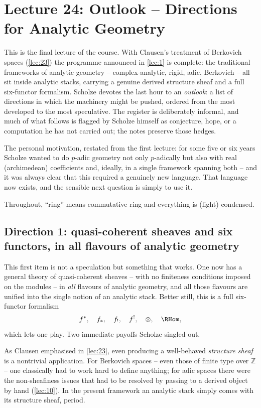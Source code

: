 \section{Lecture 24: Outlook -- Directions for Analytic Geometry}
\label{lec:24}

This is the final lecture of the course. With Clausen's treatment of Berkovich
spaces (\cref{lec:23}) the programme announced in \cref{lec:1} is complete: the
traditional frameworks of analytic geometry -- complex-analytic, rigid, adic,
Berkovich -- all sit inside analytic stacks, carrying a genuine derived
structure sheaf and a full six-functor formalism. Scholze devotes the last hour
to an \emph{outlook}: a list of directions in which the machinery might be
pushed, ordered from the most developed to the most speculative. The register
is deliberately informal, and much of what follows is flagged by Scholze himself
as conjecture, hope, or a computation he has not carried out; the notes preserve
those hedges.

The personal motivation, restated from the first lecture: for some five or six
years Scholze wanted to do $p$-adic geometry not only $p$-adically but also with
real (archimedean) coefficients and, ideally, in a single framework spanning
both -- and it was always clear that this required a genuinely new language.
That language now exists, and the sensible next question is simply to use it.

Throughout, ``ring'' means commutative ring and everything is (light) condensed.

\subsection{Direction 1: quasi-coherent sheaves and six functors, in all
flavours of analytic geometry}
\label{subsec:24:qcoh}

This first item is not a speculation but something that works. One now has a
general theory of quasi-coherent sheaves -- with no finiteness conditions
imposed on the modules -- in \emph{all} flavours of analytic geometry, and all
those flavours are unified into the single notion of an analytic stack. Better
still, this is a full six-functor formalism
\begin{equation*}
f^*,\quad f_*,\quad f_!,\quad f^!,\quad \otimes,\quad \RHom ,
\end{equation*}
which lets one play. Two immediate payoffs Scholze singled out.

\begin{remark}
\label{rmk:24:structure-sheaf}
As Clausen emphasised in \cref{lec:23}, even producing a well-behaved
\emph{structure sheaf} is a nontrivial application. For Berkovich spaces -- even
those of finite type over $\mathbb Z$ -- one classically had to work hard to
define anything; for adic spaces there were the non-sheafiness issues that had
to be resolved by passing to a derived object by hand (\cref{lec:10}). In the
present framework an analytic stack simply comes with its structure sheaf,
period.
\end{remark}

